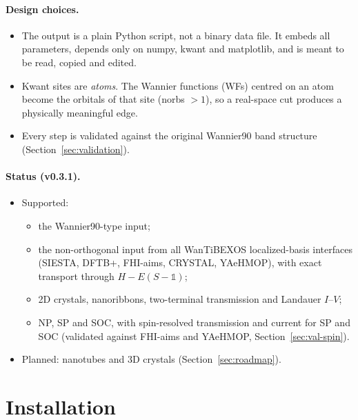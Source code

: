 \documentclass[11pt,a4paper]{article}
\newcommand{\code}[1]{{\ttfamily\def\_{\textunderscore\allowbreak}\def\slash{/\allowbreak}#1}}
\newcommand{\wtb}{WanTiBEXOS}
\begin{document}
\paragraph{Design choices.}
\begin{itemize}[nosep]
  \item The output is a plain Python script, not a binary data file. It embeds all
        parameters, depends only on \code{numpy}, \code{kwant} and \code{matplotlib}, and is
        meant to be read, copied and edited.
  \item Kwant sites are \emph{atoms}. The Wannier functions (WFs) centred on an atom become
        the orbitals of that site (\code{norbs} $>1$), so a real-space cut produces a
        physically meaningful edge.
  \item Every step is validated against the original Wannier90 band structure
        (Section~\ref{sec:validation}).
\end{itemize}

\paragraph{Status (v0.3.1).}
\begin{itemize}[nosep]
  \item Supported:
        \begin{itemize}[nosep]
          \item the Wannier90-type input;
          \item the non-orthogonal input from all \wtb{} localized-basis interfaces (SIESTA,
                DFTB+, FHI-aims, CRYSTAL, YAeHMOP), with exact transport through
                $H-E(S-\mathbb{1})$;
          \item 2D crystals, nanoribbons, two-terminal transmission and Landauer $I$--$V$;
          \item NP, SP and SOC, with spin-resolved transmission and current for SP and SOC
                (validated against FHI-aims and YAeHMOP, Section~\ref{sec:val-spin}).
        \end{itemize}
  \item Planned: nanotubes and 3D crystals (Section~\ref{sec:roadmap}).
\end{itemize}

\section{Installation}
\end{document}
